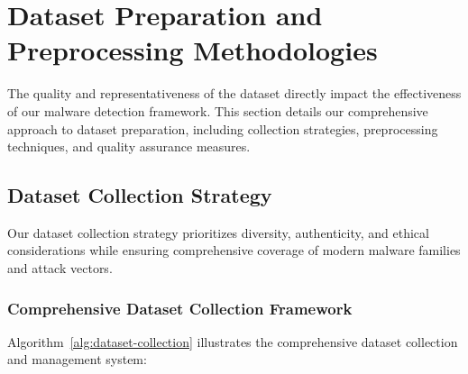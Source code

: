 \section{Dataset Preparation and Preprocessing Methodologies}
\label{sec:dataset-preparation}

The quality and representativeness of the dataset directly impact the effectiveness of our malware detection framework. This section details our comprehensive approach to dataset preparation, including collection strategies, preprocessing techniques, and quality assurance measures.

\subsection{Dataset Collection Strategy}
\label{subsec:dataset-collection}

Our dataset collection strategy prioritizes diversity, authenticity, and ethical considerations while ensuring comprehensive coverage of modern malware families and attack vectors.

\subsubsection{Comprehensive Dataset Collection Framework}

Algorithm~\ref{alg:dataset-collection} illustrates the comprehensive dataset collection and management system:


